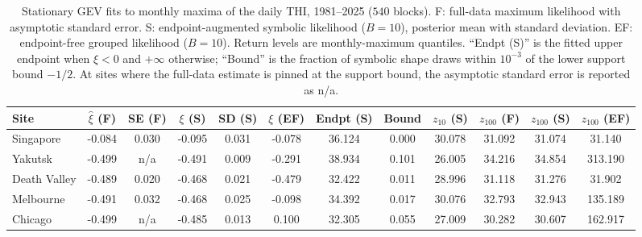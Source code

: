 \begin{table}[t]
\centering
\scriptsize
\renewcommand{\tabcolsep}{3pt}
\caption{Stationary GEV fits to monthly maxima of the daily THI, 1981--2025 ($540$ blocks). F: full-data maximum likelihood with asymptotic standard error. S: endpoint-augmented symbolic likelihood ($B=10$), posterior mean with standard deviation. EF: endpoint-free grouped likelihood ($B=10$). Return levels are monthly-maximum quantiles. ``Endpt (S)'' is the fitted upper endpoint when $\xi<0$ and $+\infty$ otherwise; ``Bound'' is the fraction of symbolic shape draws within $10^{-3}$ of the lower support bound $-1/2$. At sites where the full-data estimate is pinned at the support bound, the asymptotic standard error is reported as n/a.}
\label{tab:app-gev}
\begin{adjustbox}{max width=\textwidth}
\begin{tabular}{l *{11}{c}}
\toprule
Site & $\hat\xi$ (F) & SE (F) & $\xi$ (S) & SD (S) & $\xi$ (EF) & Endpt (S) & Bound & $z_{10}$ (S) & $z_{100}$ (F) & $z_{100}$ (S) & $z_{100}$ (EF) \\
\midrule
Singapore & -0.084 & 0.030 & -0.095 & 0.031 & -0.078 & 36.124 & 0.000 & 30.078 & 31.092 & 31.074 & 31.140 \\
Yakutsk & -0.499 & n/a & -0.491 & 0.009 & -0.291 & 38.934 & 0.101 & 26.005 & 34.216 & 34.854 & 313.190 \\
Death Valley & -0.489 & 0.020 & -0.468 & 0.021 & -0.479 & 32.422 & 0.011 & 28.996 & 31.118 & 31.276 & 31.902 \\
Melbourne & -0.491 & 0.032 & -0.468 & 0.025 & -0.098 & 34.392 & 0.017 & 30.076 & 32.793 & 32.943 & 135.189 \\
Chicago & -0.499 & n/a & -0.485 & 0.013 & 0.100 & 32.305 & 0.055 & 27.009 & 30.282 & 30.607 & 162.917 \\
\bottomrule
\end{tabular}
\end{adjustbox}
\end{table}